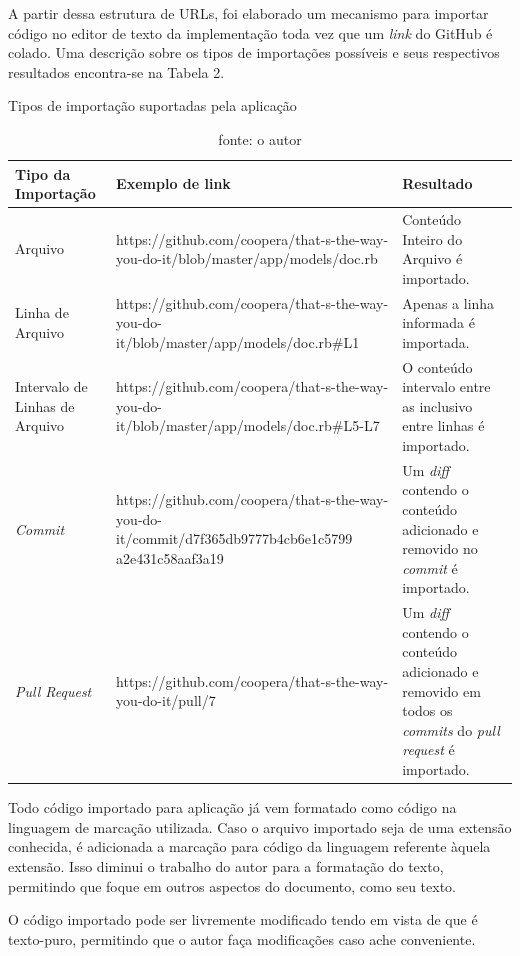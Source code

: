 A partir dessa estrutura de URLs, foi elaborado um mecanismo para importar código no editor de texto da implementação toda vez que um \textit{link} do GitHub é colado. Uma descrição sobre os tipos de importações possíveis e seus respectivos resultados encontra-se na Tabela 2.

\begin{table}[]
\centering
    \caption{Tipos de importação suportadas pela aplicação}
    \label{my-label}
    \begin{tabular}{p{3cm} | p{7cm} | p{5cm}}
    \hline
    Tipo da Importação & Exemplo de link & Resultado \\ \hline
    Arquivo & https://github.com/coopera/that-s-the-way-you-do-it/blob/master/app/models/doc.rb & Conteúdo Inteiro do Arquivo é importado. \\ \hline
    Linha de Arquivo & https://github.com/coopera/that-s-the-way-you-do-it/blob/master/app/models/doc.rb\#L1 & Apenas a linha informada é importada. \\ \hline
    Intervalo de Linhas de Arquivo & https://github.com/coopera/that-s-the-way-you-do-it/blob/master/app/models/doc.rb\#L5-L7 & O conteúdo intervalo entre as inclusivo entre linhas é importado. \\ \hline
    \textit{Commit} & https://github.com/coopera/that-s-the-way-you-do-it/commit/d7f365db9777b4cb6e1c5799 a2e431c58aaf3a19 & Um \textit{diff} contendo o conteúdo adicionado e removido no \textit{commit} é importado. \\ \hline
    \textit{Pull Request} & https://github.com/coopera/that-s-the-way-you-do-it/pull/7 & Um \textit{diff} contendo o conteúdo adicionado e removido em todos os \textit{commits} do \textit{pull request} é importado.  \\ \hline
\end{tabular}
\caption*{fonte: o autor}
\end{table}


Todo código importado para aplicação já vem formatado como código na linguagem de marcação utilizada. Caso o arquivo importado seja de uma extensão conhecida, é adicionada a marcação para código da linguagem referente àquela extensão. Isso diminui o trabalho do autor para a formatação do texto, permitindo que foque em outros aspectos do documento, como seu texto.

O código importado pode ser livremente modificado tendo em vista de que é texto-puro, permitindo que o autor faça modificações caso ache conveniente.

